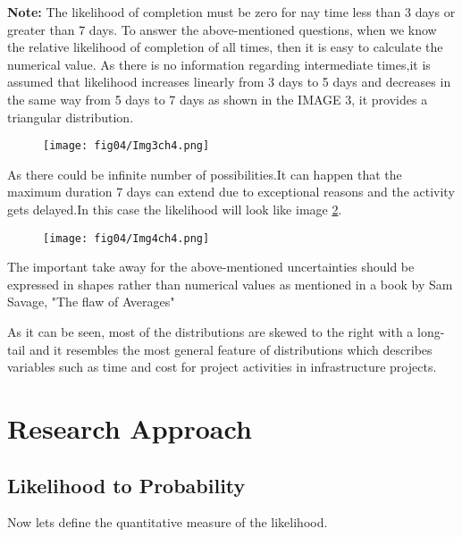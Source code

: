 \textbf{Note:} The likelihood of completion must be zero for nay time less than 3 days or greater than 7 days.
To answer the above-mentioned questions, when we know the relative likelihood of completion of all times, then it is easy to calculate the numerical value. As there is no information regarding intermediate times,it is assumed that likelihood increases linearly from 3 days to 5 days and decreases in the same way from 5 days to 7 days as shown in the IMAGE 3, it provides a triangular distribution.

\begin{figure}
	\centering
	\texttt{[image: fig04/Img3ch4.png]}
	\label{img3ch4}
\end{figure}

As there could be infinite number of possibilities.It can happen that the maximum duration 7 days can extend due to exceptional reasons and the activity gets delayed.In this case the likelihood will look like image \ref{img4ch4}.


\begin{figure}
	\centering
	\texttt{[image: fig04/Img4ch4.png]}
	\label{img4ch4}
\end{figure}

The important take away for the above-mentioned uncertainties should be expressed in shapes rather than numerical values as mentioned in a book by Sam Savage, "The flaw of Averages"

As it can be seen, most of the distributions are skewed to the right with a long-tail and it resembles the most general feature of distributions which describes variables such as time and cost for project activities in infrastructure projects.


\section{Research Approach}
\subsection{Likelihood to Probability}

Now lets define the quantitative measure of the likelihood.

